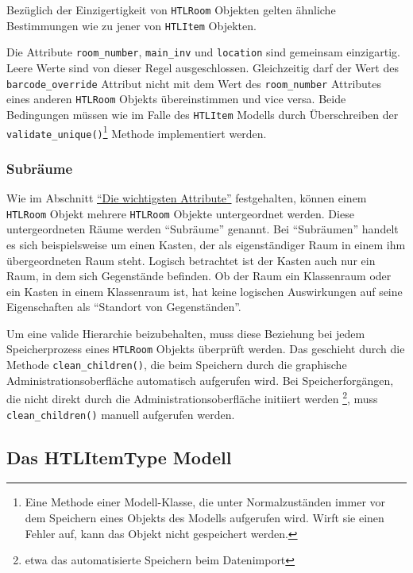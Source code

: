 Bezüglich der Einzigertigkeit von \texttt{HTLRoom} Objekten gelten
ähnliche Bestimmungen wie zu jener von \texttt{HTLItem} Objekten.

Die Attribute \texttt{room\_number}, \texttt{main\_inv} und
\texttt{location} sind gemeinsam einzigartig. Leere Werte sind von
dieser Regel ausgeschlossen. Gleichzeitig darf der Wert des
\texttt{barcode\_override} Attribut nicht mit dem Wert des
\texttt{room\_number} Attributes eines anderen \texttt{HTLRoom} Objekts
übereinstimmen und vice versa. Beide Bedingungen müssen wie im Falle des
\texttt{HTLItem} Modells durch Überschreiben der
\texttt{validate\_unique()}\footnote{Eine Methode einer Modell-Klasse,
  die unter Normalzuständen immer vor dem Speichern eines Objekts des
  Modells aufgerufen wird. Wirft sie einen Fehler auf, kann das Objekt
  nicht gespeichert werden.} Methode \cite{django-doku-models-instances}
implementiert werden.

\hypertarget{subruxe4ume}{%
\subsubsection{Subräume}\label{subruxe4ume}}

Wie im Abschnitt \protect\hyperlink{die-wichtigsten-attribute-1}{``Die
wichtigsten Attribute''} festgehalten, können einem \texttt{HTLRoom}
Objekt mehrere \texttt{HTLRoom} Objekte untergeordnet werden. Diese
untergeordneten Räume werden ``Subräume'' genannt. Bei ``Subräumen''
handelt es sich beispielsweise um einen Kasten, der als eigenständiger
Raum in einem ihm übergeordneten Raum steht. Logisch betrachtet ist der
Kasten auch nur ein Raum, in dem sich Gegenstände befinden. Ob der Raum
ein Klassenraum oder ein Kasten in einem Klassenraum ist, hat keine
logischen Auswirkungen auf seine Eigenschaften als ``Standort von
Gegenständen''.

Um eine valide Hierarchie beizubehalten, muss diese Beziehung bei jedem
Speicherprozess eines \texttt{HTLRoom} Objekts überprüft werden. Das
geschieht durch die Methode \texttt{clean\_children()}, die beim
Speichern durch die graphische Administrationsoberfläche automatisch
aufgerufen wird. Bei Speicherforgängen, die nicht direkt durch die
Administrationsoberfläche initiiert werden \footnote{etwa das
  automatisierte Speichern beim Datenimport}, muss
\texttt{clean\_children()} manuell aufgerufen werden.

\hypertarget{das-htlitemtype-modell}{%
\subsection{Das HTLItemType Modell}\label{das-htlitemtype-modell}}


